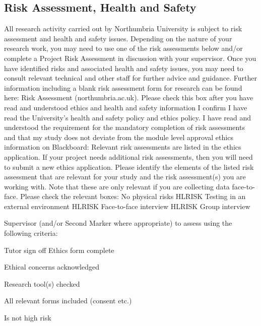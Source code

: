 \documentclass[../CHEFCookingHelperForEveryonesFridge.tex]{subfiles}
\begin{document}

\subsection{Risk Assessment, Health and Safety}
All research activity carried out by Northumbria University is subject to risk assessment and health and safety issues. Depending on the nature of your research work, you may need to use one of the risk assessments below and/or complete a Project Risk Assessment in discussion with your supervisor. Once you have identified risks and associated health and safety issues, you may need to consult relevant technical and other staff for further advice and guidance. Further information including a blank risk assessment form for research can be found here: Risk Assessment (northumbria.ac.uk).
Please check this box after you have read and understood ethics and health and safety information
   I confirm I have read the University's health and safety policy and ethics policy. I have read and understood the requirement for the mandatory completion of risk assessments and that my study does not deviate from the module level approval ethics information on Blackboard:  Relevant risk assessments are listed in the ethics application. If your project needs additional risk assessments, then you will need to submit a new ethics application. Please identify the elements of the listed risk assessment that are relevant for your study and the risk assessment(s) you are working with. Note that these are only relevant if you are collecting data face-to-face.
Please check the relevant boxes:
   No physical risks
   HL\textunderscore RISK Testing in an external environment
   HL\textunderscore RISK Face-to-face interview
   HL\textunderscore RISK Group interview

Supervisor (and/or Second Marker where appropriate) to assess using the following criteria:

Tutor sign off
Ethics form complete 

Ethical concerns acknowledged 

Research tool(s) checked 

All relevant forms included (consent etc.) 

Is not high risk 
\end{document}

